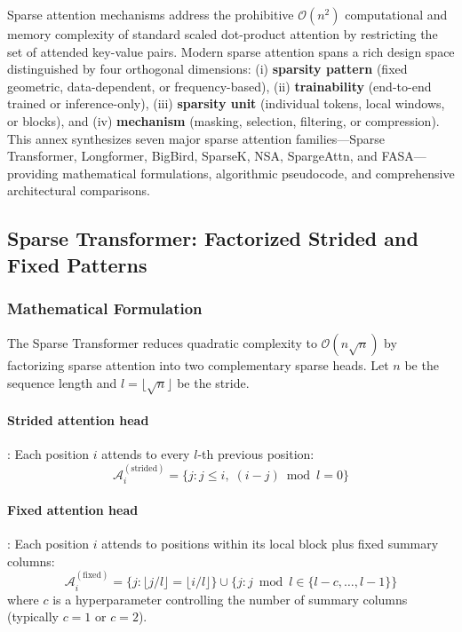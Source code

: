 \documentclass[11pt,a4paper]{article}
\begin{document}
Sparse attention mechanisms address the prohibitive $\mathcal{O}(n^2)$ computational and memory complexity of standard scaled dot-product attention by restricting the set of attended key-value pairs. Modern sparse attention spans a rich design space distinguished by four orthogonal dimensions: (i) \textbf{sparsity pattern} (fixed geometric, data-dependent, or frequency-based), (ii) \textbf{trainability} (end-to-end trained or inference-only), (iii) \textbf{sparsity unit} (individual tokens, local windows, or blocks), and (iv) \textbf{mechanism} (masking, selection, filtering, or compression). This annex synthesizes seven major sparse attention families---Sparse Transformer, Longformer, BigBird, SparseK, NSA, SpargeAttn, and FASA---providing mathematical formulations, algorithmic pseudocode, and comprehensive architectural comparisons.

\subsection{Sparse Transformer: Factorized Strided and Fixed Patterns}

\subsubsection{Mathematical Formulation}

The Sparse Transformer \citep{child_sparse_transformer_2019} reduces quadratic complexity to $\mathcal{O}(n\sqrt{n})$ by factorizing sparse attention into two complementary sparse heads. Let $n$ be the sequence length and $l = \lfloor\sqrt{n}\rfloor$ be the stride.

\paragraph{Strided attention head}: Each position $i$ attends to every $l$-th previous position:
\[
\mathcal{A}_i^{(\text{strided})} = \{j : j \leq i,\; (i - j) \bmod l = 0\}
\]

\paragraph{Fixed attention head}: Each position $i$ attends to positions within its local block plus fixed summary columns:
\[
\mathcal{A}_i^{(\text{fixed})} = \{j : \lfloor j/l \rfloor = \lfloor i/l \rfloor\} \cup \{j : j \bmod l \in \{l-c, \ldots, l-1\}\}
\]
where $c$ is a hyperparameter controlling the number of summary columns (typically $c=1$ or $c=2$).
\end{document}
